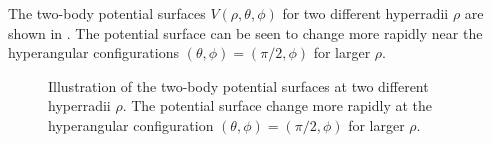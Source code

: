 The two-body potential surfaces $V(\rho,\theta,\phi)$ for two different hyperradii $\rho$ are shown in . The potential surface can be seen to change more rapidly near the hyperangular configurations $(\theta,\phi)=(\pi/2,\phi)$ for larger $\rho$. 

\begin{figure}[htbp!]
	\centering
	\hfill %
	\caption{Illustration of the two-body potential surfaces at two different hyperradii $\rho$. The potential surface change more rapidly at the hyperangular configuration $(\theta,\phi)=(\pi/2,\phi)$ for larger $\rho$.}\label{fig:surfaces}
\end{figure}
